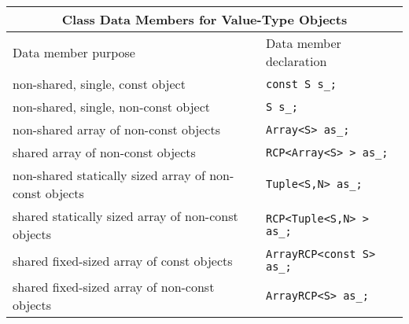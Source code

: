 \begin{tabular}{|l|l|}
%
\multicolumn{2}{c}{\textbf{Class Data Members for Value-Type Objects}} \\
%
\hline
Data member purpose
& Data member declaration \\
\hline
\hline
non-shared, single, const object
& {}\texttt{const S s\_;} \\
\hline
non-shared, single, non-const object
& {}\texttt{S s\_;} \\
\hline
non-shared array of non-const objects
& {}\texttt{Array<S> as\_;} \\
\hline
shared array of non-const objects
& {}\texttt{RCP<Array<S> > as\_;} \\
\hline
non-shared statically sized array of non-const objects
& {}\texttt{Tuple<S,N> as\_;} \\
\hline
shared statically sized array of non-const objects
& {}\texttt{RCP<Tuple<S,N> > as\_;} \\
\hline
shared fixed-sized array of const objects
& {}\texttt{ArrayRCP<const S> as\_;} \\
\hline
shared fixed-sized array of non-const objects
& {}\texttt{ArrayRCP<S> as\_;} \\
\hline
\end{tabular}
